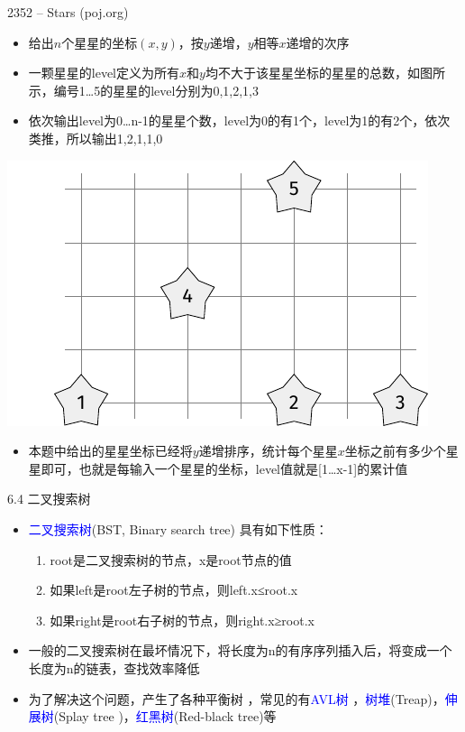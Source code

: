 \begin{frame}{2352 -- Stars (poj.org)}
    \begin{itemize}
        \item  给出$n$个星星的坐标$(x,y)$，按$y$递增，$y$相等$x$递增的次序
        \item 一颗星星的level定义为所有$x$和$y$均不大于该星星坐标的星星的总数，如图所示，编号1…5的星星的level分别为0,1,2,1,3
        \item 依次输出level为0…n-1的星星个数，level为0的有1个，level为1的有2个，依次类推，所以输出1,2,1,1,0
    \end{itemize}
    \includegraphics[scale=.6,center]{fig/6-5.pdf}
    \begin{itemize}
        \item  本题中给出的星星坐标已经将$y$递增排序，统计每个星星$x$坐标之前有多少个星星即可，也就是每输入一个星星的坐标，level值就是[1…x-1]的累计值
    \end{itemize}
\end{frame}
\begin{frame}{6.4 二叉搜索树}
    \begin{itemize}
        \item  \textcolor{blue}{二叉搜索树}(BST, Binary search tree) 具有如下性质：
        \begin{enumerate}[(1)]
            \item root是二叉搜索树的节点，x是root节点的值
            \item 如果left是root左子树的节点，则left.x≤root.x
            \item 如果right是root右子树的节点，则right.x≥root.x
        \end{enumerate}
        \vfill
        \item 一般的二叉搜索树在最坏情况下，将长度为n的有序序列插入后，将变成一个长度为n的链表，查找效率降低
        \vfill
        \item 为了解决这个问题，产生了各种平衡树 ，常见的有\textcolor{blue}{AVL树} ，\textcolor{blue}{树堆}(Treap)，\textcolor{blue}{伸展树}(Splay tree )，\textcolor{blue}{红黑树}(Red-black tree)等
    \end{itemize}
\end{frame}
